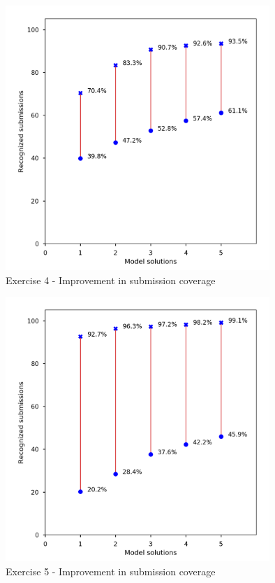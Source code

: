 \begin{figure}
\centering
\includegraphics[height=10cm]{graphs/coverage-4.png}
\caption{Exercise 4 - Improvement in submission coverage}
\label{fig:improvements-coverage-4}
\end{figure}

\begin{figure}
\centering
\includegraphics[height=10cm]{graphs/coverage-5.png}
\caption{Exercise 5 - Improvement in submission coverage}
\label{fig:improvements-coverage-5}
\end{figure}

